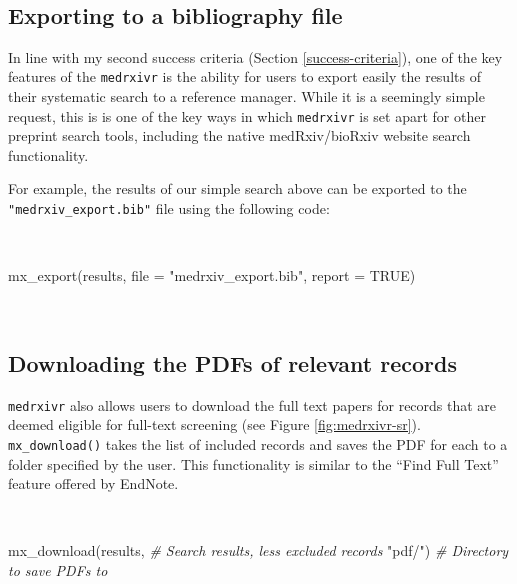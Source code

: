 \documentclass[a4paper, twoside]{templates/ociamthesis}
\newenvironment{Shaded}{\begin{snugshade}}{\end{snugshade}}
\newcommand{\AttributeTok}[1]{\textcolor[rgb]{0.77,0.63,0.00}{#1}}
\newcommand{\CommentTok}[1]{\textcolor[rgb]{0.56,0.35,0.01}{\textit{#1}}}
\newcommand{\ConstantTok}[1]{\textcolor[rgb]{0.00,0.00,0.00}{#1}}
\newcommand{\FunctionTok}[1]{\textcolor[rgb]{0.00,0.00,0.00}{#1}}
\newcommand{\NormalTok}[1]{#1}
\newcommand{\StringTok}[1]{\textcolor[rgb]{0.31,0.60,0.02}{#1}}
\renewenvironment{Shaded}
{
  \vspace{4pt}%
  \begin{snugshade}%
}{%
  \end{snugshade}%
  \vspace{4pt}%
}
\begin{document}
~

\hypertarget{exporting-to-a-bibliography-file}{%
\subsection{Exporting to a bibliography file}\label{exporting-to-a-bibliography-file}}

In line with my second success criteria (Section \ref{success-criteria}), one of the key features of the \texttt{medrxivr} is the ability for users to export easily the results of their systematic search to a reference manager. While it is a seemingly simple request, this is is one of the key ways in which \texttt{medrxivr} is set apart for other preprint search tools, including the native medRxiv/bioRxiv website search functionality.

For example, the results of our simple search above can be exported to the \texttt{"medrxiv\_export.bib"} file using the following code:

~

\begin{Shaded}
\begin{Highlighting}[]
\FunctionTok{mx\_export}\NormalTok{(results, }
          \AttributeTok{file =} \StringTok{"medrxiv\_export.bib"}\NormalTok{,}
          \AttributeTok{report =} \ConstantTok{TRUE}\NormalTok{)}
\end{Highlighting}
\end{Shaded}

~

\hypertarget{downloading-the-pdfs-of-relevant-records}{%
\subsection{Downloading the PDFs of relevant records}\label{downloading-the-pdfs-of-relevant-records}}

\texttt{medrxivr} also allows users to download the full text papers for records that are deemed eligible for full-text screening (see Figure \ref{fig:medrxivr-sr}). \texttt{mx\_download()} takes the list of included records and saves the PDF for each to a folder specified by the user. This functionality is similar to the ``Find Full Text'' feature offered by EndNote.

~

\begin{Shaded}
\begin{Highlighting}[]
\FunctionTok{mx\_download}\NormalTok{(results,  }\CommentTok{\# Search results, less excluded records}
            \StringTok{"pdf/"}\NormalTok{)   }\CommentTok{\# Directory to save PDFs to }
\end{Highlighting}
\end{Shaded}
\end{document}
